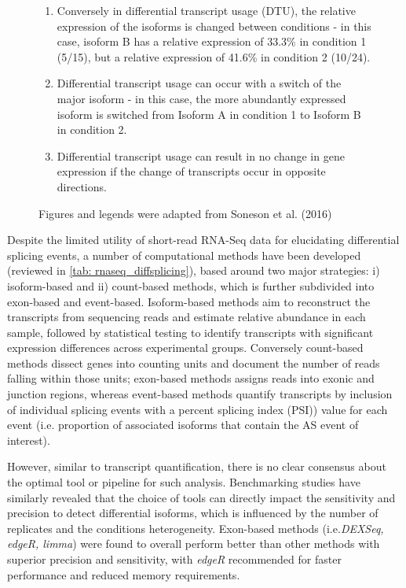 \begin{figure}[htp]
{\begin{enumerate}[label=\textbf{\Alph*})]
		\item Conversely in differential transcript usage (DTU), the relative expression of the isoforms is changed between conditions - in this case, isoform B has a relative expression of 33.3\% in condition 1 (5/15), but a relative expression of 41.6\% in condition 2 (10/24).
		\item Differential transcript usage can occur with a switch of the major isoform - in this case, the more abundantly expressed isoform is switched from Isoform A in condition 1 to Isoform B in condition 2. 
		\item Differential transcript usage can result in no change in gene expression if the change of transcripts occur in opposite directions.
		\\
	\end{enumerate} 
	Figures and legends were adapted from Soneson et al. (2016)\cite{Soneson2016} 
   }
	\label{fig:dte_dtu_explanation}
\end{figure}

Despite the limited utility of short-read RNA-Seq data for elucidating differential splicing events, a number of computational methods have been developed (reviewed in \cref{tab: rnaseq_diffsplicing}), based around two major strategies: i) isoform-based and ii) count-based methods, which is further subdivided into exon-based and event-based. Isoform-based methods aim to reconstruct the transcripts from sequencing reads and estimate relative abundance in each sample, followed by statistical testing to identify transcripts with significant expression differences across experimental groups\cite{Mehmood2020}. Conversely count-based methods dissect genes into counting units and document the number of reads falling within those units\cite{Mehmood2020}; exon-based methods assigns reads into exonic and junction regions, whereas event-based methods quantify transcripts by inclusion of individual splicing events with a percent splicing index (PSI)) value for each event (i.e. proportion of associated isoforms that contain the AS event of interest). 

However, similar to transcript quantification, there is no clear consensus about the optimal tool or pipeline for such analysis. Benchmarking studies have similarly revealed that the choice of tools can directly impact the sensitivity and precision to detect differential isoforms, which is influenced by the number of replicates and the conditions heterogeneity\cite{Merino2019}. Exon-based methods (i.e.\textit{DEXSeq, edgeR, limma}) were found to overall perform better than other methods with superior precision and sensitivity, with \textit{edgeR} recommended for faster performance and reduced memory requirements\cite{Mehmood2020}. 



